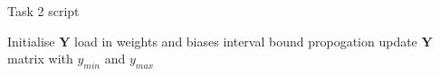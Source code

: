 \documentclass[11pt]{article}
\begin{document}
\begin{algorithm}
    \caption{Task 2 script}\label{alg:Task2}
    \begin{algorithmic}
    \State Initialise $\boldsymbol{Y}$ 
    \State load in weights and biases
        \State interval bound propogation
        \State update $\boldsymbol{Y}$ matrix with $y_{min}$ and $y_{max}$
    \EndFor
\end{algorithmic}
\end{algorithm}
\end{document}
